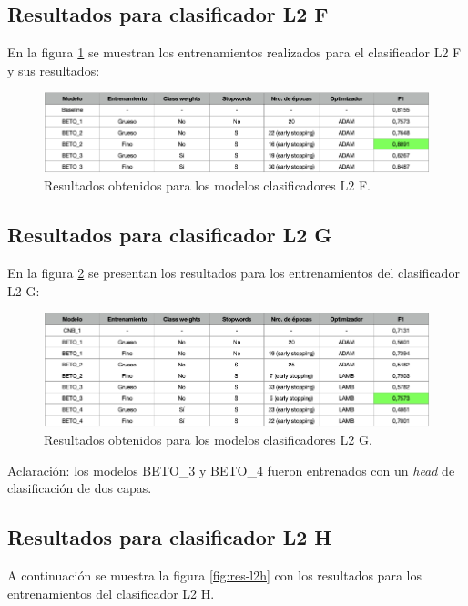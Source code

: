 \subsection{Resultados para clasificador L2 F}

En la figura \ref{fig:res-l2f} se muestran los entrenamientos realizados para el clasificador L2 F y sus resultados:

\begin{figure}[htbp]
	\centering
	\includegraphics[width=1\textwidth]{./Figures/cap4-resultados-l2f.png}
	\caption{Resultados obtenidos para los modelos clasificadores L2 F.}
	\label{fig:res-l2f}
\end{figure}

\subsection{Resultados para clasificador L2 G}

En la figura \ref{fig:res-l2g} se presentan los resultados para los entrenamientos del clasificador L2 G:

\begin{figure}[htbp]
	\centering
	\includegraphics[width=1\textwidth]{./Figures/cap4-resultados-l2g.png}
	\caption{Resultados obtenidos para los modelos clasificadores L2 G.}
	\label{fig:res-l2g}
\end{figure}

Aclaración: los modelos BETO\_3 y BETO\_4 fueron entrenados con un \textit{head} de clasificación de dos capas.

\subsection{Resultados para clasificador L2 H}

A continuación se muestra la figura \ref{fig:res-l2h} con los resultados para los entrenamientos del clasificador L2 H.


